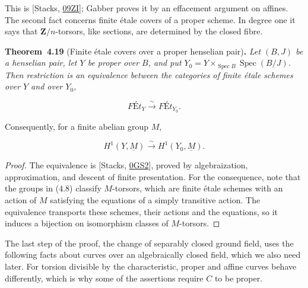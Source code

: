 \documentclass[11pt]{article}
\newenvironment{bpstatement}[2]{\par\addvspace{0.6\baselineskip}\noindent\textbf{#1}#2\textbf{.}\enspace\ignorespaces}
  {\par\addvspace{0.4\baselineskip}}
\newenvironment{bpstatementit}[2]{\begin{bpstatement}{#1}{#2}\itshape\ignorespaces}{\end{bpstatement}}
\begin{document}
\label{bp52}%
This is [Stacks, \href{https://stacks.math.columbia.edu/tag/09ZI}{09ZI}]; Gabber proves it by an effacement argument on affines. The second fact concerns finite étale covers of a proper scheme. In degree one it says that \(\mathbf Z/n\)-torsors, like sections, are determined by the closed fibre.

\label{bp53}%
\begin{bpstatementit}{Theorem~4.19}{ (Finite étale covers over a proper henselian pair)}
Let \((B,J)\) be a henselian pair, let \(Y\) be proper over \(B\), and put \(Y_0=Y\times_{\operatorname{Spec}B}\operatorname{Spec}(B/J)\). Then restriction is an equivalence between the categories of finite étale schemes over \(Y\) and over \(Y_0\),

\[
\textit{F\'Et}_Y\xrightarrow{\sim}\textit{F\'Et}_{Y_0}.
\]

Consequently, for a finite abelian group \(M\),

\[
H^1(Y,\underline M)\xrightarrow{\sim}H^1(Y_0,\underline M).
\tag{4.8}
\]
\end{bpstatementit}

\begin{proof}[{Proof}]\label{bp54}%
The equivalence is [Stacks, \href{https://stacks.math.columbia.edu/tag/0GS2}{0GS2}], proved by algebraization, approximation, and descent of finite presentation. For the consequence, note that the groups in (4.8) classify \(M\)-torsors, which are finite étale schemes with an action of \(M\) satisfying the equations of a simply transitive action. The equivalence transports these schemes, their actions and the equations, so it induces a bijection on isomorphism classes of \(M\)-torsors.
\end{proof}

\label{bp55}%
The last step of the proof, the change of separably closed ground field, uses the following facts about curves over an algebraically closed field, which we also need later. For torsion divisible by the characteristic, proper and affine curves behave differently, which is why some of the assertions require \(C\) to be proper.
\end{document}
